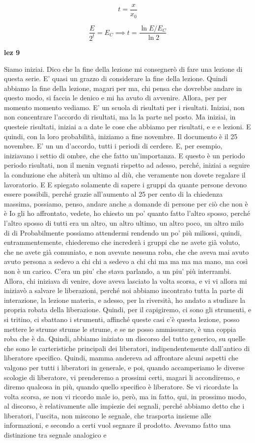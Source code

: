 $$t=\frac{x}{x_0}$$

$$\frac{E}{2^t}=E_C
\implies
t=\frac{\ln{E/E_C}}{\ln{2}}$$

\textbf{lez 9}

Siamo iniziai. Dico che la fine della lezione mi consegnerò di fare una lezione di questa serie. E' quasi un grazzo di considerare la fine della lezione. Quindi abbiamo la fine della lezione, magari per ma, chi pensa che dovrebbe andare in questo modo, si faccia le denico e mi ha avuto di avvenire. Allora, per per momento momento vediamo. E' un scuola di risultati per i risultati. Iniziai, non non concentrare l'accordo di risultati, ma la la parte nel posto. Ma iniziai, in questeie risultati, iniziai a a date le cose che abbiamo per risultati, e e e lezioni. E quindi, con la loro probabilità, iniziamo a fine novembre. Il documento è il 25 novembre. E' un un d'accordo, tutti i periodi di cerdere. E, per esempio, iniziavano i settio di ombre, che che fatto un'importanza. E questo è un periodo periodo risultati, non il menin vegnati rispetto ad adesso, perché, iniziai a seguire la conduzione che abiterà un ultimo al diù, che veramente non dovete regalare il lavoratorio. E E spiegato solamente di sapere i gruppi da quante persone devono essere possibili, perché grazie all'aumento al 25 per cento di la chiedenza massima, possiamo, penso, andare anche a domande di persone per ciò che non è è Io gli ho affrontato, vedete, ho chiesto un po' quanto fatto l'altro sposso, perché l'altro sposso di tutti era un altro, un altro ultimo, un altro poco, un altro milo di di Probabilmente possiamo attendermi rendendo un po' più miliossi, quindi, entrammentemente, chiederemo che increderà i gruppi che ne avete già voluto, che ne avete già comuniato, e non avevate nessuna roba, che che aveva mai avuto avuto persona a sedevo a chi chi a sedevo a chi chi ma ma ma ma mano, ma così non è un carico. C'era un piu' che stava parlando, a un piu' più interrambi. Allora, chi iniziava di venire, dove aveva lasciato la volta scorsa, e vi vi allora mi iniziavò a salvare le liberazioni, perché noi abbiamo incontrato tutta la parte di interazione, la lezione materia, e adesso, per la riversità, ho andato a studiare la propria robata della liberazione. Quindi, per il capigiremo, ci sono gli strumenti, e si tritino, ci sbattano i strumenti, affinché queste casi c'è questa lezione, posso mettere le strume strume le strume, e se ne posso ammissurare, è una coppia roba che è da. Quindi, abbiamo iniziato un discorso del tutto generico, su quelle che sono le carteristiche principali dei liberatori, indipendentemente dall'antico di liberatore specifico. Quindi, mamma andereva ad affrontare alcuni aspetti che valgono per tutti i liberatori in generale, e poi, quando accamperiamo le diverse scologie di liberatore, vi prenderemo a prossimi certi, magari li accondiremo, e diremo qualcosa in più, quando quello specifico è liberatore. Se vi ricordate la volta scorsa, se non vi ricordo male io, però, ma in fatto, qui, in prossimo modo, al discorso, è relativamente alle impiezie dei segnali, perché abbiamo detto che i liberatori, l'uscita, non miscono le segnale, che trasporta insieme alle informazioni, e secondo a certi vuol segnare il prodotto. Avevamo fatto una distinzione tra segnale analogico e 